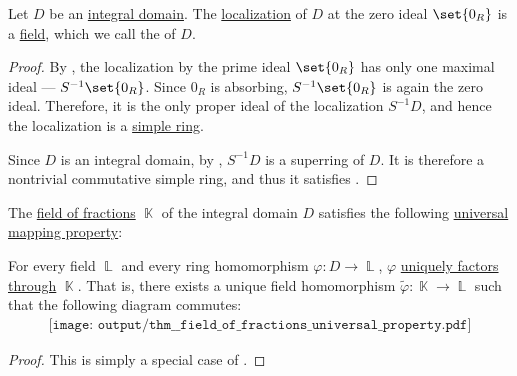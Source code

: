 \begin{proposition}\label{thm:field_of_fractions}
  Let \( D \) be an \hyperref[def:integral_domain]{integral domain}. The \hyperref[def:ring_localization]{localization} of \( D \) at the zero ideal \( \set{ 0_R } \) is a \hyperref[def:field]{field}, which we call the  of \( D \).
\end{proposition}
\begin{proof}
  By , the localization by the prime ideal \( \set{ 0_R } \) has only one maximal ideal --- \( S^{-1} \set{ 0_R } \). Since \( 0_R \) is absorbing, \( S^{-1} \set{ 0_R } \) is again the zero ideal. Therefore, it is the only proper ideal of the localization \( S^{-1} D \), and hence the localization is a \hyperref[def:ring/simple]{simple ring}.

  Since \( D \) is an integral domain, by , \( S^{-1} D \) is a superring of \( D \). It is therefore a nontrivial commutative simple ring, and thus it satisfies .
\end{proof}

\begin{theorem}\label{thm:field_of_fractions_universal_property}
  The \hyperref[thm:field_of_fractions]{field of fractions} \( \BbbK \) of the integral domain \( D \) satisfies the following \hyperref[rem:universal_mapping_property]{universal mapping property}:
  \begin{displayquote}
    For every field \( \BbbL \) and every ring homomorphism \( \varphi: D \to \BbbL \), \( \varphi \) \hyperref[def:factors_through]{uniquely factors through} \( \BbbK \). That is, there exists a unique field homomorphism \( \widetilde{\varphi}: \BbbK \to \BbbL \) such that the following diagram commutes:
    \begin{equation}\label{eq:thm:field_of_fractions_universal_property/diagram}
      \begin{aligned}
        \texttt{[image: output/thm\_\_field\_of\_fractions\_universal\_property.pdf]}
      \end{aligned}
    \end{equation}
  \end{displayquote}
\end{theorem}
\begin{proof}
  This is simply a special case of .
\end{proof}

